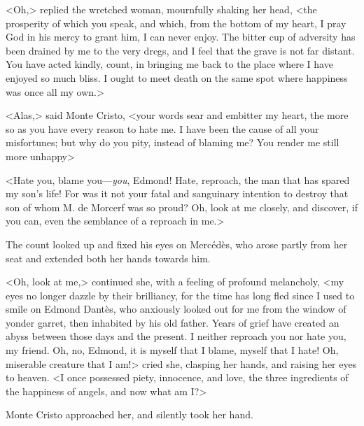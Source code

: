  <Oh,> replied the wretched woman, mournfully shaking her head, <the prosperity of which you speak, and which, from the bottom of my heart, I pray God in his mercy to grant him, I can never enjoy. The bitter cup of adversity has been drained by me to the very dregs, and I feel that the grave is not far distant. You have acted kindly, count, in bringing me back to the place where I have enjoyed so much bliss. I ought to meet death on the same spot where happiness was once all my own.> 

 <Alas,> said Monte Cristo, <your words sear and embitter my heart, the more so as you have every reason to hate me. I have been the cause of all your misfortunes; but why do you pity, instead of blaming me? You render me still more unhappy\longdash> 

 <Hate you, blame you—\textit{you}, Edmond! Hate, reproach, the man that has spared my son's life! For was it not your fatal and sanguinary intention to destroy that son of whom M. de Morcerf was so proud? Oh, look at me closely, and discover, if you can, even the semblance of a reproach in me.> 

 The count looked up and fixed his eyes on Mercédès, who arose partly from her seat and extended both her hands towards him. 

 <Oh, look at me,> continued she, with a feeling of profound melancholy, <my eyes no longer dazzle by their brilliancy, for the time has long fled since I used to smile on Edmond Dantès, who anxiously looked out for me from the window of yonder garret, then inhabited by his old father. Years of grief have created an abyss between those days and the present. I neither reproach you nor hate you, my friend. Oh, no, Edmond, it is myself that I blame, myself that I hate! Oh, miserable creature that I am!> cried she, clasping her hands, and raising her eyes to heaven. <I once possessed piety, innocence, and love, the three ingredients of the happiness of angels, and now what am I?> 

 Monte Cristo approached her, and silently took her hand. 

